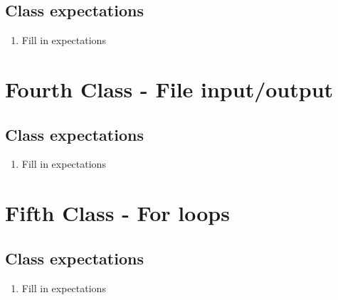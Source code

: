 \documentclass[paper=a4, fontsize=11pt]{scrartcl} %
\numberwithin{equation}{section} %
\numberwithin{figure}{section} %
\numberwithin{table}{section} %
\begin{document}

\subsection{Class expectations}

\begin{enumerate}
\item Fill in expectations
\end{enumerate}


\section{Fourth Class - File input/output}


\subsection{Class expectations}

\begin{enumerate}
\item Fill in expectations
\end{enumerate}


\section{Fifth Class - For loops}


\subsection{Class expectations}

\begin{enumerate}
\item Fill in expectations 
\end{enumerate}

\end{document}

